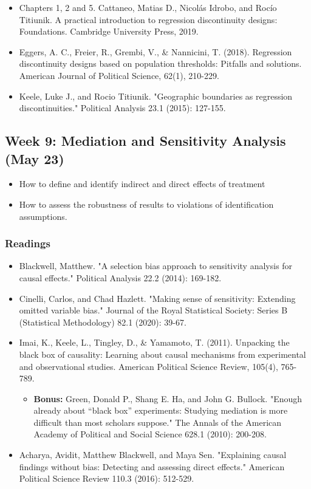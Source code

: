 \documentclass[11pt, article, oneside]{memoir}
\theoremstyle{Assumption}
\begin{document}
\begin{itemize}
\item Chapters 1, 2 and 5. Cattaneo, Matias D., Nicolás Idrobo, and Rocío Titiunik. A practical introduction to regression discontinuity designs: Foundations. Cambridge University Press, 2019.
\item Eggers, A. C., Freier, R., Grembi, V., \& Nannicini, T. (2018). Regression discontinuity designs based on population thresholds: Pitfalls and solutions. American Journal of Political Science, 62(1), 210-229.
\item Keele, Luke J., and Rocio Titiunik. "Geographic boundaries as regression discontinuities." Political Analysis 23.1 (2015): 127-155.
\end{itemize}



\subsection{Week 9: Mediation and Sensitivity Analysis (May 23)}

\begin{itemize}
\item How to define and identify indirect and direct effects of treatment
\item How to assess the robustness of results to violations of identification assumptions. 
\end{itemize}

\subsubsection*{Readings}

\begin{itemize}
\item Blackwell, Matthew. "A selection bias approach to sensitivity analysis for causal effects." Political Analysis 22.2 (2014): 169-182.
\item Cinelli, Carlos, and Chad Hazlett. "Making sense of sensitivity: Extending omitted variable bias." Journal of the Royal Statistical Society: Series B (Statistical Methodology) 82.1 (2020): 39-67.
\item Imai, K., Keele, L., Tingley, D., \& Yamamoto, T. (2011). Unpacking the black box of causality: Learning about causal mechanisms from experimental and observational studies. American Political Science Review, 105(4), 765-789.
\begin{itemize}
\item \textbf{Bonus:} Green, Donald P., Shang E. Ha, and John G. Bullock. "Enough already about “black box” experiments: Studying mediation is more difficult than most scholars suppose." The Annals of the American Academy of Political and Social Science 628.1 (2010): 200-208.
\end{itemize}
\item Acharya, Avidit, Matthew Blackwell, and Maya Sen. "Explaining causal findings without bias: Detecting and assessing direct effects." American Political Science Review 110.3 (2016): 512-529.
\end{itemize}
\end{document}
